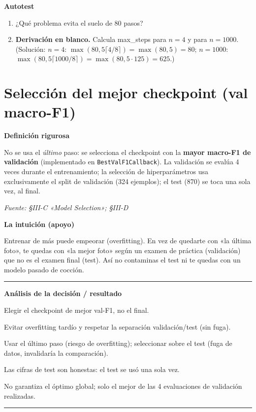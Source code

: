 \documentclass[11pt,a4paper]{article}
\newcommand{\nivel}[1]{\medskip\noindent\textbf{\textcolor{blue!45!black}{#1}}\par\nopagebreak\smallskip}
\newcommand{\fuente}[1]{\nopagebreak\par\hfill{\footnotesize\textit{Fuente: #1}}\par}
\newenvironment{analisis}{%
  \medskip\par\noindent\rule{\linewidth}{0.4pt}\par\nopagebreak
  \textbf{Análisis de la decisión / resultado}\par\nopagebreak\smallskip
  \begin{description}[leftmargin=2.6cm,style=nextline,font=\bfseries]
}{%
  \end{description}\noindent\rule{\linewidth}{0.4pt}\par\medskip
}
\begin{document}
\nivel{Autotest}
\begin{enumerate}[nosep]
  \item ¿Qué problema evita el suelo de 80 pasos?
  \item \textbf{Derivación en blanco.} Calcula max\_steps para $n{=}4$ y para $n{=}1000$.
        (Solución: $n{=}4$: $\max(80,5\lceil4/8\rceil)=\max(80,5)=80$; $n{=}1000$:
        $\max(80,5\lceil1000/8\rceil)=\max(80,5\cdot125)=625$.)
\end{enumerate}

\section{Selección del mejor checkpoint (val macro-F1)}\label{sec:checkpoint}

\nivel{Definición rigurosa}
No se usa el \emph{último} paso: se selecciona el checkpoint con la \textbf{mayor macro-F1 de
validación} (implementado en \texttt{BestValF1Callback}). La validación se evalúa 4 veces durante el
entrenamiento; la selección de hiperparámetros usa exclusivamente el split de validación (324
ejemplos); el test (870) se toca una sola vez, al final.
\fuente{\S III-C «Model Selection»; \S III-D}

\nivel{La intuición (apoyo)}
Entrenar de más puede empeorar (overfitting). En vez de quedarte con «la última foto», te quedas con
«la mejor foto» según un examen de práctica (validación) que no es el examen final (test). Así no
contaminas el test ni te quedas con un modelo pasado de cocción.

\begin{analisis}
  \item[Qué] Elegir el checkpoint de mejor val-F1, no el final.
  \item[Por qué] Evitar overfitting tardío y respetar la separación validación/test (sin fuga).
  \item[Alternativas descartadas] Usar el último paso (riesgo de overfitting); seleccionar sobre el
        test (fuga de datos, invalidaría la comparación).
  \item[Qué significa] Las cifras de test son honestas: el test se usó una sola vez.
  \item[Qué NO significa] No garantiza el óptimo global; solo el mejor de las 4 evaluaciones de
        validación realizadas.
\end{analisis}
\end{document}
